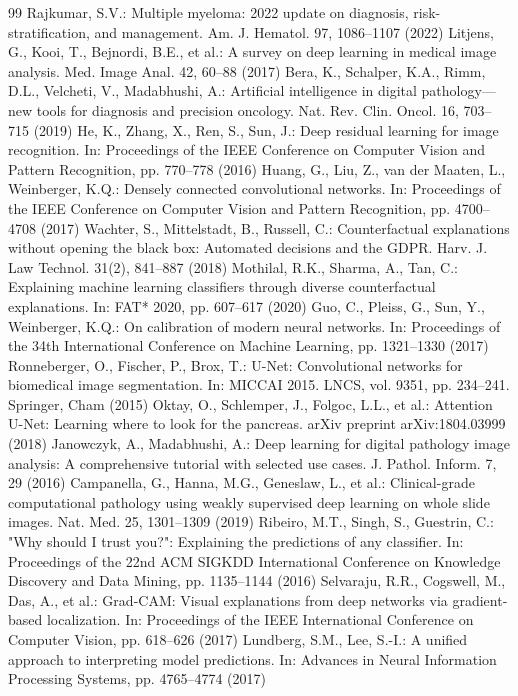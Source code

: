 \documentclass[runningheads]{llncs}
\begin{document}
\begin{thebibliography}{99}
 Rajkumar, S.V.: Multiple myeloma: 2022 update on diagnosis, risk-stratification, and management. Am. J. Hematol. 97, 1086--1107 (2022)
 Litjens, G., Kooi, T., Bejnordi, B.E., et al.: A survey on deep learning in medical image analysis. Med. Image Anal. 42, 60--88 (2017)
 Bera, K., Schalper, K.A., Rimm, D.L., Velcheti, V., Madabhushi, A.: Artificial intelligence in digital pathology---new tools for diagnosis and precision oncology. Nat. Rev. Clin. Oncol. 16, 703--715 (2019)
 He, K., Zhang, X., Ren, S., Sun, J.: Deep residual learning for image recognition. In: Proceedings of the IEEE Conference on Computer Vision and Pattern Recognition, pp. 770--778 (2016)
 Huang, G., Liu, Z., van der Maaten, L., Weinberger, K.Q.: Densely connected convolutional networks. In: Proceedings of the IEEE Conference on Computer Vision and Pattern Recognition, pp. 4700--4708 (2017)
 Wachter, S., Mittelstadt, B., Russell, C.: Counterfactual explanations without opening the black box: Automated decisions and the GDPR. Harv. J. Law Technol. 31(2), 841--887 (2018)
 Mothilal, R.K., Sharma, A., Tan, C.: Explaining machine learning classifiers through diverse counterfactual explanations. In: FAT* 2020, pp. 607--617 (2020)
 Guo, C., Pleiss, G., Sun, Y., Weinberger, K.Q.: On calibration of modern neural networks. In: Proceedings of the 34th International Conference on Machine Learning, pp. 1321--1330 (2017)
 Ronneberger, O., Fischer, P., Brox, T.: U-Net: Convolutional networks for biomedical image segmentation. In: MICCAI 2015. LNCS, vol. 9351, pp. 234--241. Springer, Cham (2015)
 Oktay, O., Schlemper, J., Folgoc, L.L., et al.: Attention U-Net: Learning where to look for the pancreas. arXiv preprint arXiv:1804.03999 (2018)
 Janowczyk, A., Madabhushi, A.: Deep learning for digital pathology image analysis: A comprehensive tutorial with selected use cases. J. Pathol. Inform. 7, 29 (2016)
 Campanella, G., Hanna, M.G., Geneslaw, L., et al.: Clinical-grade computational pathology using weakly supervised deep learning on whole slide images. Nat. Med. 25, 1301--1309 (2019)
 Ribeiro, M.T., Singh, S., Guestrin, C.: "Why should I trust you?": Explaining the predictions of any classifier. In: Proceedings of the 22nd ACM SIGKDD International Conference on Knowledge Discovery and Data Mining, pp. 1135--1144 (2016)
 Selvaraju, R.R., Cogswell, M., Das, A., et al.: Grad-CAM: Visual explanations from deep networks via gradient-based localization. In: Proceedings of the IEEE International Conference on Computer Vision, pp. 618--626 (2017)
 Lundberg, S.M., Lee, S.-I.: A unified approach to interpreting model predictions. In: Advances in Neural Information Processing Systems, pp. 4765--4774 (2017)
\end{thebibliography}
\end{document}
